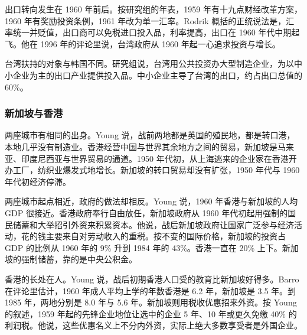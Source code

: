 出口转向发生在 1960 年前后。按研究组的年表，1959 年有十九点财经改革方案，1960 年有奖励投资条例，1961 年改为单一汇率\cite{worldbank1993}。Rodrik 概括的正统说法是，汇率统一并贬值，出口商可以免税进口投入品，利率提高，出口在 1960 年代中期起飞\cite{rodrik1994}。他在 1996 年的评论里说，台湾政府从 1960 年起一心追求投资与增长\cite{collinsbosworth1996}。

台湾扶持的对象与韩国不同。研究组说，台湾用公共投资办大型制造企业，为以中小企业为主的出口产业提供投入品\cite{worldbank1993}。中小企业主导了台湾的出口，约占出口总值的 60\%\cite{worldbank1993}。

\subsubsection{新加坡与香港}

两座城市有相同的出身。Young 说，战前两地都是英国的殖民地，都是转口港，本地几乎没有制造业\cite{young1992}。香港经营中国与世界其余地方之间的贸易，新加坡是马来亚、印度尼西亚与世界贸易的通道\cite{young1992}。1950 年代初，从上海逃来的企业家在香港开办工厂，纺织业爆发式地增长\cite{young1992}。新加坡的转口贸易却没有扩张，1950 年代与 1960 年代初经济停滞\cite{young1992}。

两座城市起点相近，政府的做法却相反。Young 说，1960 年香港与新加坡的人均 GDP 很接近\cite{young1992}。香港政府奉行自由放任，新加坡政府从 1960 年代初起用强制的国民储蓄和大举招引外资来积累资本\cite{young1992}。他说，战后新加坡政府让国家广泛参与经济活动，花的钱主要来自对劳动收入的重税\cite{young1992}。按不变的国际价格，新加坡的投资占 GDP 的比例从 1960 年的 9\% 升到 1984 年的 43\%\cite{young1992}。香港一直在 20\% 上下\cite{young1992}。新加坡的强制储蓄，靠的是中央公积金。

香港的长处在人。Young 说，战后初期香港人口受的教育比新加坡好得多\cite{young1992}。Barro 在评论里估计，1960 年成人平均上学的年数香港是 6.2 年，新加坡是 3.5 年\cite{young1992}。到 1985 年，两地分别是 8.0 年与 5.6 年\cite{young1992}。新加坡则用税收优惠招来外资。按 Young 的叙述，1959 年起的先锋企业地位让选中的企业 5 年、10 年或更久免缴 40\% 的利润税\cite{young1992}。他说，这些优惠名义上不分内外资，实际上绝大多数享受者是外国企业\cite{young1992}。

